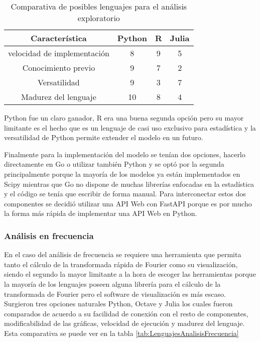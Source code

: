     \begin{table}[ht]
        \caption[Comparativa de posibles lenguajes para el análisis exploratorio]{Comparativa de posibles lenguajes para el análisis exploratorio}
        \label{tab:LenguajesAnalisisExploratorio}
        \begin{center}
            \vspace{0.3cm}
            \begin{tabular}{|c|c|c|c|}
                \hline
                Característica              & Python & R & Julia\\\hline
                \hline
                velocidad de implementación & 8     & 9     & 5 \\\hline
                Conocimiento previo         & 9     & 7     & 2 \\\hline
                Versatilidad              & 9     & 3     & 7 \\\hline
                Madurez del lenguaje        & 10    & 8     & 4 \\\hline
            \end{tabular}
        \end{center}
    \end{table}

    Python fue un claro ganador, R era una buena segunda opción pero su mayor
    limitante es el hecho que es un lenguaje de casi uso exclusivo para
    estadística y la versatilidad de Python  permite extender el modelo en un
    futuro.

    Finalmente para la implementación del modelo se tenían dos opciones,
    hacerlo directamente en Go o utilizar también Python y se optó por la
    segunda principalmente porque la mayoría de los modelos ya están
    implementados en Scipy mientras que Go no dispone de muchas librerías
    enfocadas en la estadística y el código se tenía que escribir de forma
    manual. Para interconectar estos dos componentes se decidió utilizar una
    API Web con FastAPI porque es por mucho la forma más rápida de implementar
    una API Web en Python.

    \subsubsection{Análisis en frecuencia}
    En el caso del análisis de frecuencia se requiere una herramienta que
    permita tanto el cálculo de la transformada rápida de Fourier como su
    visualización, siendo el segundo la mayor limitante a la hora de escoger
    las herramientas porque la mayoría de los lenguajes poseen alguna librería
    para el cálculo de la transformada de Fourier pero el software de
    visualización es más escaso. Surgieron tres opciones naturales Python,
    Octave y Julia los cuales fueron comparados de acuerdo a su facilidad de
    conexión con el resto de componentes, modificabilidad de las gráficas,
    velocidad de ejecución y madurez del lenguaje. Esta comparativa se puede
    ver en la tabla \ref{tab:LenguajesAnalisisFrecuencia}

